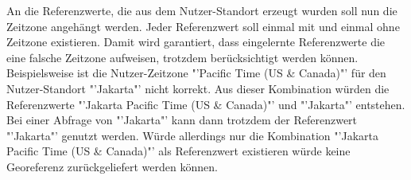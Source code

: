 				An die Referenzwerte, die aus dem Nutzer-Standort erzeugt wurden soll nun die Zeitzone angehängt werden.
				Jeder Referenzwert soll einmal mit und einmal ohne Zeitzone existieren. 
				Damit wird garantiert, dass eingelernte Referenzwerte die eine falsche Zeitzone aufweisen, trotzdem berücksichtigt werden können. 
				Beispielsweise ist die Nutzer-Zeitzone "'Pacific Time (US \& Canada)"' für den Nutzer-Standort "'Jakarta"' nicht korrekt.
				Aus dieser Kombination würden die Referenzwerte "'Jakarta Pacific Time (US \& Canada)"' und "'Jakarta"' entstehen. 
				Bei einer Abfrage von "'Jakarta"' kann dann trotzdem der Referenzwert "'Jakarta"' genutzt werden. 
				Würde allerdings nur die Kombination "'Jakarta Pacific Time (US \& Canada)"' als Referenzwert existieren würde keine Georeferenz zurückgeliefert werden können.

